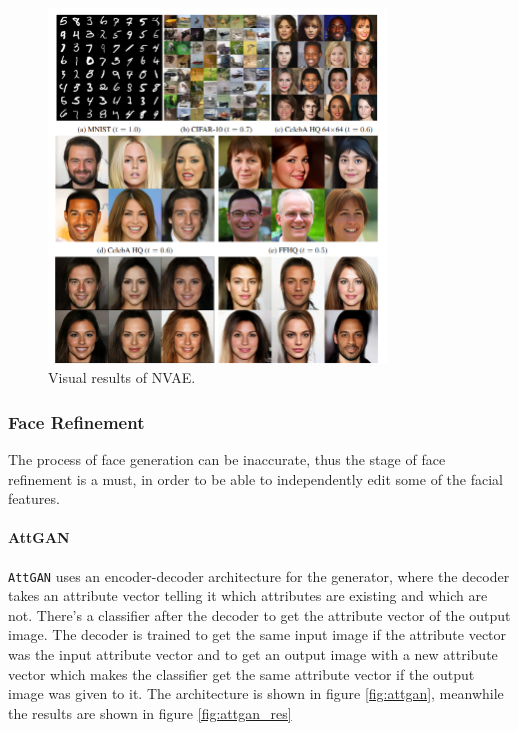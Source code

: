 \begin{figure}[H]
    \centering
    \includegraphics[width=0.8\textwidth]{images/nvae.png}
    \caption{Visual results of NVAE.}
    \label{fig:nvae}
\end{figure}

\subsubsection{Face Refinement}
The process of face generation can be inaccurate, thus the stage of face refinement is a must, in order to be able to independently edit some of the facial features.

\paragraph{AttGAN}
\texttt{AttGAN} \cite{he2018attgan} uses an encoder-decoder architecture for the generator, where the decoder takes an attribute vector telling it which attributes are existing and which are not. There’s a classifier after the decoder to get the attribute vector of the output image. The decoder is trained to get the same input image if the attribute vector was the input attribute vector and to get an output image with a new attribute vector which makes the classifier get the same attribute vector if the output image was given to it. The architecture is shown in figure \ref{fig:attgan}, meanwhile the results are shown in figure \ref{fig:attgan_res}

